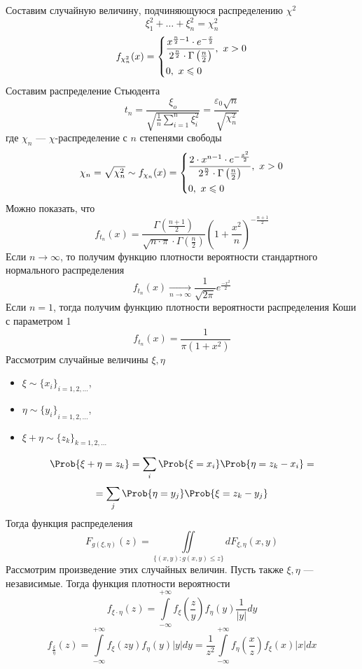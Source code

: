 Составим случайную величину, подчиняющуюся распределению $\chi^2$
\[
	\xi_1^2 + \ldots + \xi_n^2 = \chi_n^2
\]
\[
	f_{\chi_n^2} (x) = \begin{dcases*}
	\frac{x^{\frac{n}{2}-1} \cdot e^{-\frac{x}{2}} }{2^{\frac{n}{2}} \cdot \Gamma \left( \frac{n}{2} \right)}, \ x > 0 \\
	0, \ x \leqslant 0
	\end{dcases*}
\]
Составим распределение Стьюдента
\[
	t_n = \frac{\xi_o}{\sqrt{\frac{1}{n} \sum\limits_{i=1}^{n} \xi_i^2}} = \frac{\varepsilon_0 \sqrt{n}}{\sqrt{\chi_n^2}} 
\]
где $\chi_n$ --- $\chi$-распределение с $n$ степенями свободы
\[
	\chi_n = \sqrt{\chi_n^2} \sim f_{\chi_n} (x) = \begin{dcases*}
	\frac{2 \cdot x^{n-1} \cdot e^{-\frac{x^2}{2}}}{2^{\frac{n}{2}} \cdot \Gamma \left( \frac{n}{2} \right)}, \ x > 0\\
	0, \ x \leqslant 0
	\end{dcases*}
\]
Можно показать, что
\[
	f_{t_n} (x) = \frac{\Gamma \left( \frac{n + 1}{2} \right)}{\sqrt{n \cdot \pi} \cdot \Gamma \left( \frac{n}{2} \right)} \left( 1 + \frac{x^2}{n} \right)^{-\frac{n+1}{2}}
\]
Если $n \to \infty$, то получим функцию плотности вероятности стандартного нормального распределения
\[
	f_{t_n} (x) \underset{n \to \infty}{\rightarrow} \frac{1}{\sqrt{2\pi}} e^{\frac{-x^2}{2}}
\]
Если $n = 1$, тогда получим функцию плотности вероятности распределения Коши с параметром 1
\[
	f_{t_n} (x) = \frac{1}{\pi (1 + x^2)}
\]
Рассмотрим случайные величины $\xi, \eta$
\begin{itemize}
	\item $\xi \sim {\{ x_i \}}_{i = 1, 2, \ldots}$,
	\item $\eta \sim {\{ y_i \}}_{i = 1, 2, \ldots}$,
	\item $\xi + \eta \sim {\{ z_k \}}_{k = 1, 2, \ldots}$
\end{itemize}
\[
	\Prob \{ \xi + \eta = z_k \} = \sum\limits_{i} \Prob \{ \xi = x_i \} \Prob \{ \eta = z_k - x_i \} = 
\]
\[
	= \sum\limits_{j} \Prob \{ \eta = y_j \} \Prob \{ \xi = z_k - y_j \}
\]
Тогда функция распределения
\[
	F_{g(\xi, \eta)} (z) = \iint\limits_{\{ (x, y) : g(x, y) \leqslant z \}} dF_{\xi, \eta} (x, y)
\]
Рассмотрим произведение этих случайных величин. Пусть также $\xi, \eta$ --- независимые. Тогда функция плотности вероятности
\[
	f_{\xi \cdot \eta} (z) = \int\limits_{-\infty}^{+\infty} f_{\xi} (\frac{z}{y}) f_{\eta} (y) \frac{1}{|y|} dy
\]
\[
	f_{\frac{\xi}{\eta}} (z) = \int\limits_{-\infty}^{+\infty} f_{\xi} (zy) f_{\eta} (y) |y| dy = \frac{1}{z^2} \int\limits_{-\infty}^{+\infty} f_{\eta} \left(\frac{x}{z}\right) f_{\xi} (x) |x| dx
\]
